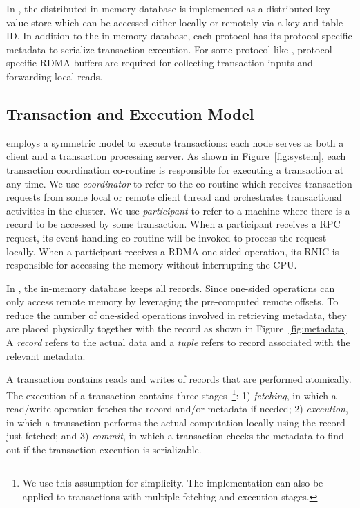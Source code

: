 In \projectname, the distributed in-memory database is implemented as a distributed key-value store which can be accessed either locally or remotely via a key and table ID. In addition to the in-memory database, each protocol has its protocol-specific metadata to serialize transaction execution. For some protocol like \calvin, protocol-specific RDMA buffers are required for collecting transaction inputs and forwarding local reads. 

\subsection{Transaction and Execution Model}

\projectname employs a symmetric model to execute transactions: each node serves as both a client and a transaction processing server. As shown in Figure~\ref{fig:system}, each transaction coordination co-routine is responsible for executing a transaction at any time. 
We use {\em coordinator} to refer to the co-routine which receives transaction requests from some local or remote client thread and orchestrates transactional activities in the cluster. We use {\em participant} to refer to a machine where there is a record to be accessed by some transaction. When a 
participant receives a RPC request, its event handling co-routine will be invoked to process the request locally.
When a participant receives a RDMA one-sided 
operation, its RNIC is responsible for accessing the memory without interrupting the CPU.

In \projectname, the in-memory database keeps all records. Since one-sided operations can only access remote memory by leveraging the pre-computed remote offsets. To reduce the number of one-sided operations involved in retrieving metadata, they are placed physically together with the record
as shown in Figure~\ref{fig:metadata}.
A {\em record} refers to the 
actual data and a {\em tuple} refers to record associated 
with the relevant metadata.


A transaction contains reads and writes of 
records that are performed atomically.
The execution of a transaction contains three
stages~\footnote{We use this assumption for simplicity. The implementation
can also be applied to transactions with multiple fetching and execution stages.}: 
1) {\em fetching}, in which a read/write operation fetches the record and/or metadata if needed;
2) {\em execution}, in which a transaction  performs the actual computation locally using the record just fetched; and 
3) {\em commit}, in which a transaction checks the metadata to find out if the transaction execution is serializable. 




